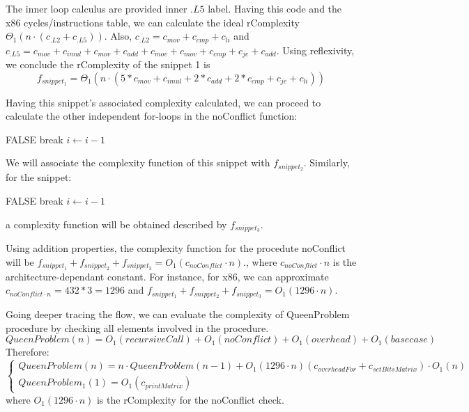 The inner loop calculus are provided inner $.L5$ label. Having this code and the x86 cycles/instructions table, we can calculate the ideal rComplexity $\Theta_{1}(n \cdot (c_{.L2} + c_{.L5}))$. Also, $c_{.L2} = c_{mov} + c_{cmp} + c_{li}$ and $c_{.L5} = c_{mov} + c_{imul} + c_{mov} +  c_{add} + c_{mov} + c_{mov} + c_{cmp} + c_{je} + c_{add} $. Using reflexivity, we conclude the rComplexity of the snippet 1 is \[f_{snippet_{1}} =  \Theta_{1}(n \cdot ( 5 * c_{mov} + c_{imul} + 2 * c_{add} +2 *  c_{cmp} + c_{je} + c_{li}))\]

Having this snippet's associated complexity calculated, we can proceed to calculate the other independent for-loops in the noConflict function:
\begin{algorithmic}[1]
			\State \Return FALSE
		\EndIf
		\State break
	\EndIf
	\State $i \gets i-1$	
	\EndFor
\end{algorithmic}
We will associate the complexity function of this snippet with $f_{snippet_{2}}$. Similarly, for the snippet:

\begin{algorithmic}[1]
			\State \Return FALSE
		\EndIf
		\State break
	\EndIf
	\State $i \gets i-1$	
	\EndFor
\end{algorithmic}
a complexity function will be obtained described by $f_{snippet_{3}}$.

Using addition properties, the complexity function for the procedute noConflict will be $f_{snippet_{1}} + f_{snippet_{2}} + f_{snippet_{3}} = O_{1}(c_{noConflict} \cdot n)$., where $c_{noConflict} \cdot n$ is the architecture-dependant constant. For instance, for x86, we can approximate $c_{noConflict \cdot n} = 432 * 3 = 1296$ and $f_{snippet_{1}} + f_{snippet_{2}} + f_{snippet_{3}} = O_{1}(1296 \cdot n) $.



Going deeper tracing the flow, we can evaluate the complexity of QueenProblem procedure by checking all elements involved in the procedure.
 \[QueenProblem(n) = O_{1}(recursiveCall) + O_{1}(noConflict) + O_{1}(overhead) + O_{1}(basecase) \]
Therefore:
 \[\begin{cases} QueenProblem(n) = n \cdot QueenProblem(n-1) +  O_{1}(1296 \cdot n) (c_{overheadFor} + c_{setBitsMatrix}) \cdot O_{1}(n) \\ QueenProblem_{1}(1)=O_{1}(c_{printMatrix}) \end{cases}\]
 where $O_{1}(1296 \cdot n)$ is the rComplexity for the noConflict check.
 

